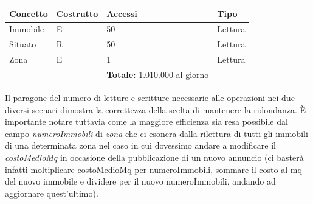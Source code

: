 \documentclass[a4paper,12pt]{report}
\begin{document}
            \begin{table}[H]
            \centering
             \begin{tabular}{llll}
             \rowcolor{green!20} \textbf{Concetto} & \textbf{Costrutto} & \textbf{Accessi} & \textbf{Tipo}\\ [0.5ex] 
             \hline
             Immobile & E & 50 & Lettura \\ 
             Situato & R & 50 & Lettura \\ 
             Zona & E & 1 & Lettura \\ 
             \hline
                \rowcolor{green!20} &   & \textbf{Totale:}  1.010.000 al giorno &  \\ [1ex] 
             
             \end{tabular}
            \end{table}
            Il paragone del numero di letture e scritture necessarie alle operazioni nei due diversi scenari
            dimostra la correttezza della scelta di mantenere la ridondanza. È importante notare tuttavia come
            la maggiore efficienza sia resa possibile dal campo \textit{numeroImmobili} di \textit{zona} che
            ci esonera dalla rilettura di tutti gli immobili di una determinata zona nel caso in cui dovessimo 
            andare a modificare il \textit{costoMedioMq} in occasione della pubblicazione di un nuovo annuncio 
            (ci basterà infatti moltiplicare costoMedioMq per numeroImmobili, sommare il costo al mq del nuovo 
            immobile e dividere per il nuovo numeroImmobili, andando ad aggiornare quest'ultimo). \\
            \\
      
        \newpage
\end{document}
